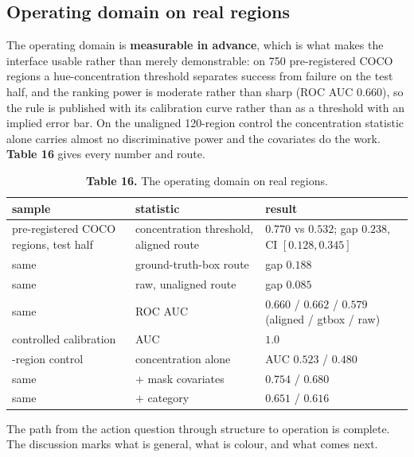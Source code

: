 \subsection{Operating domain on real regions}

The operating domain is \textbf{measurable in advance}, which is what makes the interface usable rather than merely demonstrable: on 750 pre-registered COCO regions a hue-concentration threshold separates success from failure on the test half, and the ranking power is moderate rather than sharp (ROC AUC $0.660$), so the rule is published with its calibration curve rather than as a threshold with an implied error bar. On the unaligned 120-region control the concentration statistic alone carries almost no discriminative power and the covariates do the work. \textbf{Table 16} gives every number and route.


\begin{table}[t]
\centering
\small
\caption*{\textbf{Table 16.} The operating domain on real regions.}
\begin{tabularx}{\textwidth}{@{}>{\raggedright\arraybackslash}X >{\raggedright\arraybackslash}X >{\raggedright\arraybackslash}X@{}}
\toprule
\textbf{sample} & \textbf{statistic} & \textbf{result} \\
\midrule
750 pre-registered COCO regions, test half & concentration threshold, aligned route & $0.770$ vs $0.532$; gap $0.238$, CI $[0.128,\allowbreak{}0.345]$ \\
same & ground-truth-box route & gap $0.188$ \\
same & raw, unaligned route & gap $0.085$ \\
same & ROC AUC & $0.660$ / $0.662$ / $0.579$ (aligned / gtbox / raw) \\
controlled calibration & AUC & $1.0$ \\
120-region control & concentration alone & AUC $0.523$ / $0.480$ \\
same & $+$ mask covariates & $0.754$ / $0.680$ \\
same & $+$ category & $0.651$ / $0.616$ \\
\bottomrule
\end{tabularx}
\end{table}

The path from the action question through structure to operation is complete. The discussion marks what is general, what is colour, and what comes next.

